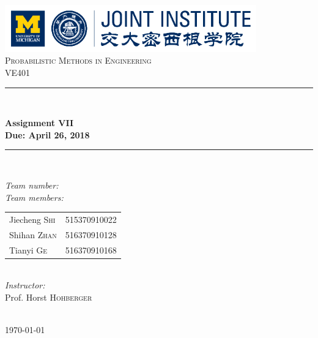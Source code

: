\begin{titlepage}

\newcommand{\HRule}{\rule{\linewidth}{0.5mm}}

\center

\includegraphics[height=0.8in]{images/logo.png}\\[1cm]

\textsc{\Large Probabilistic Methods in Engineering}\\[0.4cm]
\textsc{\large VE401}\\[0.4cm]

\HRule \\[0.4cm]
{
    \bfseries
    {\huge Assignment VII}\\[0.3cm]
    {\large Due: April 26, 2018}\\[0.2cm]
    \HRule \\[1.5cm]
}

\begin{minipage}{0.4\textwidth}

\large
\emph{Team number:} \quad{}\\

\emph{Team members:}\\

\begin{tabular}{ll}
    Jiecheng  \textsc{Shi} & 515370910022\\
    Shihan  \textsc{Zhan} & 516370910128\\
    Tianyi  \textsc{Ge} & 516370910168\\
\end{tabular}\\[1cm]


\emph{Instructor:}\\[0.1cm]
Prof. Horst \textsc{Hohberger}

\end{minipage}\\[2cm]

{\large \today}\\[2cm]

\vfill

\end{titlepage}

\clearpage